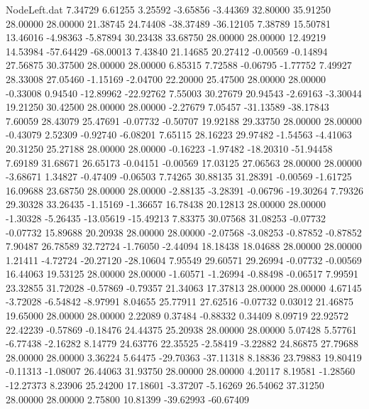 \begin{filecontents}{NodeLeft.dat}
   7.34729    6.61255    3.25592    -3.65856   -3.44369   32.80000   35.91250   28.00000   28.00000   21.38745   24.74408  -38.37489  -36.12105
   7.38789   15.50781   13.46016    -4.98363   -5.87894   30.23438   33.68750   28.00000   28.00000   12.49219   14.53984  -57.64429  -68.00013
   7.43840   21.14685   20.27412    -0.00569   -0.14894   27.56875   30.37500   28.00000   28.00000    6.85315    7.72588   -0.06795   -1.77752
   7.49927   28.33008   27.05460    -1.15169   -2.04700   22.20000   25.47500   28.00000   28.00000   -0.33008    0.94540  -12.89962  -22.92762
   7.55003   30.27679   20.94543    -2.69163   -3.30044   19.21250   30.42500   28.00000   28.00000   -2.27679    7.05457  -31.13589  -38.17843
   7.60059   28.43079   25.47691    -0.07732   -0.50707   19.92188   29.33750   28.00000   28.00000   -0.43079    2.52309   -0.92740   -6.08201
   7.65115   28.16223   29.97482    -1.54563   -4.41063   20.31250   25.27188   28.00000   28.00000   -0.16223   -1.97482  -18.20310  -51.94458
   7.69189   31.68671   26.65173    -0.04151   -0.00569   17.03125   27.06563   28.00000   28.00000   -3.68671    1.34827   -0.47409   -0.06503
   7.74265   30.88135   31.28391    -0.00569   -1.61725   16.09688   23.68750   28.00000   28.00000   -2.88135   -3.28391   -0.06796  -19.30264
   7.79326   29.30328   33.26435    -1.15169   -1.36657   16.78438   20.12813   28.00000   28.00000   -1.30328   -5.26435  -13.05619  -15.49213
   7.83375   30.07568   31.08253    -0.07732   -0.07732   15.89688   20.20938   28.00000   28.00000   -2.07568   -3.08253   -0.87852   -0.87852
   7.90487   26.78589   32.72724    -1.76050   -2.44094   18.18438   18.04688   28.00000   28.00000    1.21411   -4.72724  -20.27120  -28.10604
   7.95549   29.60571   29.26994    -0.07732   -0.00569   16.44063   19.53125   28.00000   28.00000   -1.60571   -1.26994   -0.88498   -0.06517
   7.99591   23.32855   31.72028    -0.57869   -0.79357   21.34063   17.37813   28.00000   28.00000    4.67145   -3.72028   -6.54842   -8.97991
   8.04655   25.77911   27.62516    -0.07732    0.03012   21.46875   19.65000   28.00000   28.00000    2.22089    0.37484   -0.88332    0.34409
   8.09719   22.92572   22.42239    -0.57869   -0.18476   24.44375   25.20938   28.00000   28.00000    5.07428    5.57761   -6.77438   -2.16282
   8.14779   24.63776   22.35525    -2.58419   -3.22882   24.86875   27.79688   28.00000   28.00000    3.36224    5.64475  -29.70363  -37.11318
   8.18836   23.79883   19.80419    -0.11313   -1.08007   26.44063   31.93750   28.00000   28.00000    4.20117    8.19581   -1.28560  -12.27373
   8.23906   25.24200   17.18601    -3.37207   -5.16269   26.54062   37.31250   28.00000   28.00000    2.75800   10.81399  -39.62993  -60.67409

\end{filecontents}
